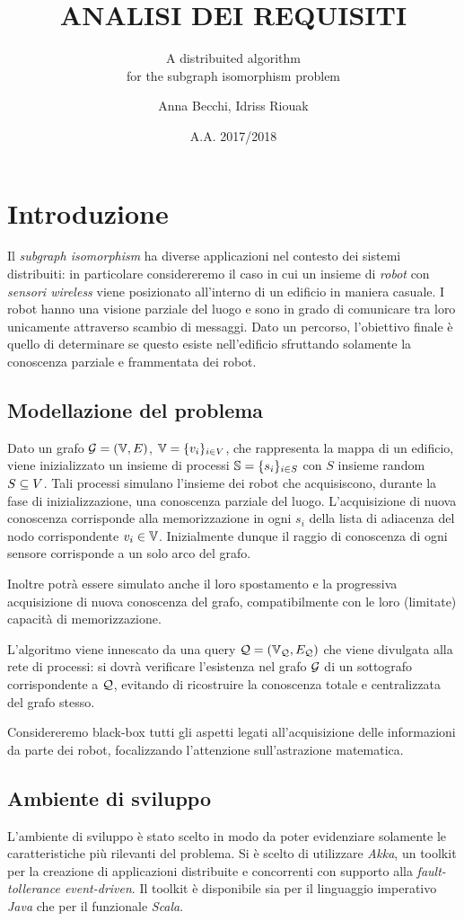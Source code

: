 \documentclass{llncs}
\subtitle{A distribuited algorithm\\for the subgraph isomorphism problem}
\title{ANALISI DEI REQUISITI}
\author{Anna Becchi, Idriss Riouak}
\institute{Laurea Magistrale in Informatica\\Universit\`a di Udine, Italy}
\date{A.A. 2017/2018}
\begin{document}
\maketitle

\section{Introduzione}
Il \emph{subgraph isomorphism} ha diverse applicazioni nel contesto
dei sistemi distribuiti: in particolare considereremo il caso in cui un insieme
di \emph{robot} con \emph{sensori wireless} viene posizionato all'interno di
un edificio in maniera casuale. I robot hanno una visione parziale del luogo
e sono in grado di comunicare tra loro unicamente attraverso scambio di messaggi.
Dato un percorso, l'obiettivo finale è quello di determinare se questo esiste
nell'edificio sfruttando solamente la conoscenza parziale e frammentata dei robot.

\subsection{Modellazione del problema}
Dato un grafo $\mathcal{G} = ( \mathbb{V}, E)$, $\mathbb{V} = \{v_i\}_{i \in V}$,
che rappresenta la mappa di un edificio, viene inizializzato un
insieme di processi $\mathbb{S} = \{s_i \}_{i \in S}$ con $S$ insieme
random $S \subseteq V$.
Tali processi simulano l'insieme dei robot che
acquisiscono, durante la fase di inizializzazione, una conoscenza
parziale del luogo. L'acquisizione di nuova conoscenza corrisponde
alla memorizzazione in ogni $s_i$ della lista di adiacenza del nodo
corrispondente $v_i \in \mathbb{V}$.
Inizialmente dunque il raggio di conoscenza di ogni sensore corrisponde
a un solo arco del grafo.

Inoltre potrà essere simulato anche il loro spostamento e la progressiva
acquisizione di nuova conoscenza del grafo, compatibilmente con le
loro (limitate) capacità di memorizzazione.

L'algoritmo viene innescato da una query $\mathcal{Q} = (\mathbb{V}_{\mathcal{Q}}, E_{\mathcal{Q}})$
che viene divulgata alla rete di processi: si dovrà verificare
l'esistenza nel grafo $\mathcal{G}$ di un sottografo corrispondente a $\mathcal{Q}$,
evitando di ricostruire la conoscenza totale e centralizzata del
grafo stesso.

Considereremo black-box tutti gli aspetti legati all'acquisizione delle informazioni
da parte dei robot, focalizzando l'attenzione sull'astrazione matematica.
%
%
\subsection{Ambiente di sviluppo}
L'ambiente di sviluppo è stato scelto in modo da poter evidenziare solamente
le caratteristiche più rilevanti del problema.
Si è scelto di utilizzare \emph{Akka}, un toolkit per la creazione di applicazioni
distribuite e concorrenti con supporto alla \emph{fault-tollerance event-driven}.
Il toolkit è disponibile sia per il linguaggio imperativo \emph{Java} che per il
funzionale \emph{Scala}.
\end{document}
